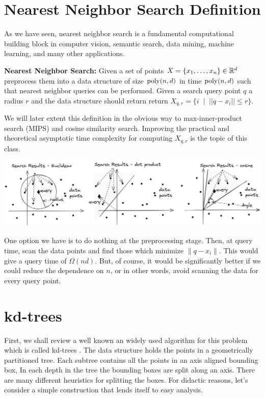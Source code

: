 \documentclass{article}
\begin{document}
\section{Nearest Neighbor Search Definition}

As we have seen, nearest neighbor search is a fundamental computational building block in computer vision, semantic search, data mining, machine learning, and many other applications.

\begin{definition}{\bf Nearest Neighbor Search:} Given a set of points $X = \{x_1,\ldots,x_n\} \in {\mathbb{R}}^{d}$ 
preprocess them into a data structure of size ${\operatorname{poly}}(n,d)$ in time ${\operatorname{poly}}(n,d)$ such that nearest neighbor queries can
be performed. Given a search query point $q$ a radius $r$ and the data structure should return  
return $X_{q,r} = \{i \;\; | \;\; ||q - x_i || \le r \}$. 
\end{definition}
We will later extent this definition in the obvious way to max-inner-product search (MIPS) and cosine similarity search.
Improving the practical and theoretical asymptotic time complexity for computing $X_{q,r}$ is the topic of this class.

\begin{center}
\includegraphics[width=1.0\textwidth]{images/vectorsearch.png}
\end{center}

One option we have is to do nothing at the preprocessing stage. Then, at query time, scan the data points and find those which minimize $\|q - x_i\|$.
This would give a query time of $\Omega(nd)$. But, of course, it would be significantly better if we could reduce the dependence on $n$, or in other words, avoid scanning the data for every query point.

\section{kd-trees}
First, we shall review a well known an widely used algorithm for this problem which is called kd-trees \cite{Bentley75}.
The data structure holds the points in a geometrically partitioned tree. 
Each subtree contains all the points in an axis aligned bounding box,
In each depth in the tree the bounding boxes are split along an axis.
There are many different heuristics for splitting the boxes. For didactic reasons, let's consider a simple construction that lends itself to easy analysis.
\end{document}
